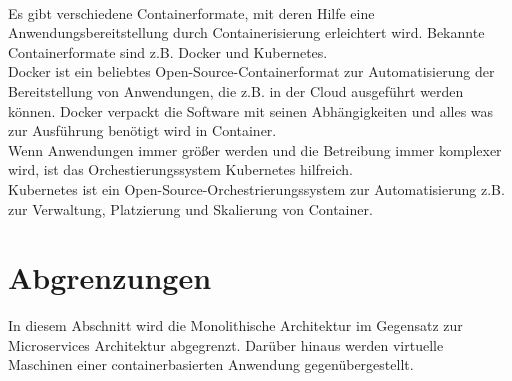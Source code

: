 \\                                                                                   Es gibt verschiedene Containerformate, mit deren Hilfe eine Anwendungsbereitstellung durch Containerisierung erleichtert wird. Bekannte Containerformate sind z.B. Docker und Kubernetes.\\
Docker ist ein beliebtes Open-Source-Containerformat zur Automatisierung der Bereitstellung von Anwendungen, die z.B. in der Cloud ausgeführt werden können. Docker verpackt die Software mit seinen Abhängigkeiten und alles was zur Ausführung benötigt wird in Container.\\
Wenn Anwendungen immer größer werden und die Betreibung immer komplexer wird, ist das Orchestierungssystem Kubernetes hilfreich.\\
Kubernetes ist ein Open-Source-Orchestrierungssystem zur Automatisierung z.B. zur Verwaltung, Platzierung und Skalierung von Container.\cite{container}
                   
\section{Abgrenzungen}
In diesem Abschnitt wird die Monolithische Architektur im Gegensatz zur Microservices Architektur abgegrenzt. Darüber hinaus werden virtuelle Maschinen einer containerbasierten Anwendung gegenübergestellt.

